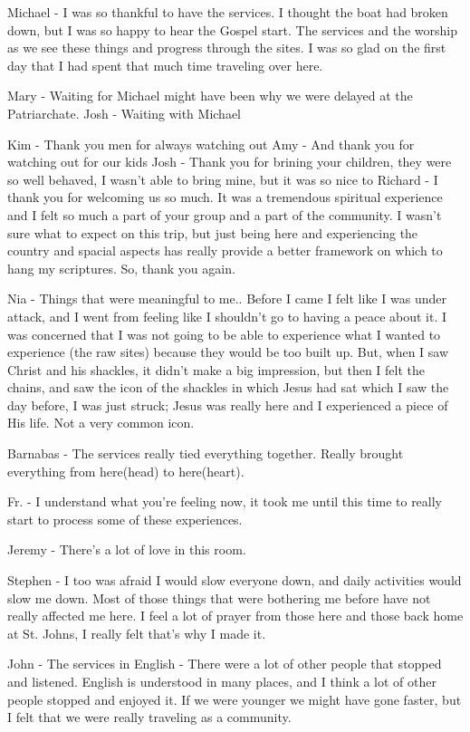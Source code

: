 \documentclass[letterpaper]{report}
\begin{document}
Michael - I was so thankful to have the services. I thought the boat had broken down, but I was so happy to hear the Gospel start. The services and the worship as we see these things and progress through the sites. I was so glad on the first day that I had spent that much time traveling over here.

Mary - Waiting for Michael might have been why we were delayed at the Patriarchate. 
Josh - Waiting with Michael 

Kim - Thank you men for always watching out
Amy - And thank you for watching out for our kids
Josh - Thank you for brining your children, they were so well behaved, I wasn't able to bring mine, but it was so nice to 
Richard - I thank you for welcoming us so much. It was a tremendous spiritual experience and I felt so much a part of your group and a part of the community.
I wasn't sure what to expect on this trip, but just being here and experiencing the country and spacial aspects has really provide a better framework on which to hang my scriptures.  So, thank you again.

Nia - Things that were meaningful to me.. Before I came I felt like I was under attack, and I went from feeling like I shouldn't go to having a peace about it.
I was concerned that I was not going to be able to experience what I wanted to experience (the raw sites) because they would be too built up.
But, when I saw Christ and his shackles, it didn't make a big impression, but then I felt the chains, and saw the icon of the shackles in which Jesus had sat which I saw the day before, I was just struck; Jesus was really here and I experienced a piece of His life.
  Not a very common icon.

Barnabas - The services really tied everything together.
  Really brought everything from here(head) to here(heart).

Fr. - I understand what you're feeling now, it took me until this time to really start to process some of these experiences.

Jeremy - There's a lot of love in this room.

Stephen - I too was afraid I would slow everyone down, and daily activities would slow me down. Most of those things that were bothering me before have not really affected me here. I feel a lot of prayer from those here and those back home at St. Johns, I really felt that's why I made it.

John - The services in English - There were a lot of other people that stopped and listened. English is understood in many places, and I think a lot of other people stopped and enjoyed it.  If we were younger we might have gone faster, but I felt that we were really traveling as a community.
\end{document}
